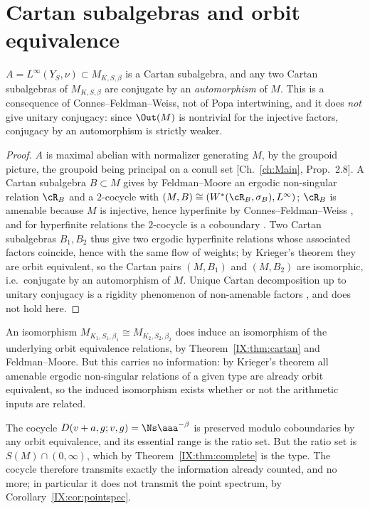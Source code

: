 \section{Cartan subalgebras and orbit equivalence}

\begin{theorem}\label{IX:thm:cartan}
$A=L^\infty(Y_S,\nu)\subset M_{K,S,\beta}$ is a Cartan subalgebra, and any two Cartan
subalgebras of $M_{K,S,\beta}$ are conjugate by an \emph{automorphism} of $M$. This is a
consequence of Connes--Feldman--Weiss, not of Popa intertwining, and it does \emph{not} give
unitary conjugacy: since $\Out(M)$ is nontrivial for the injective factors, conjugacy by an
automorphism is strictly weaker.
\end{theorem}

\begin{proof}
$A$ is maximal abelian with normalizer generating $M$, by the groupoid picture, the groupoid
being principal on a conull set [Ch.~\ref{ch:Main}, Prop.~2.8]. A Cartan subalgebra $B\subset M$ gives
by Feldman--Moore \cite{FM} an ergodic non-singular relation $\cR_B$ and a $2$-cocycle with
$(M,B)\cong(W^*(\cR_B,\sigma_B),L^\infty)$; $\cR_B$ is amenable because $M$ is injective, hence
hyperfinite by Connes--Feldman--Weiss \cite{CFW}, and for hyperfinite relations the
$2$-cocycle is a coboundary \cite{FM}. Two Cartan subalgebras $B_1,B_2$ thus give two ergodic
hyperfinite relations whose associated factors coincide, hence with the same flow of weights;
by Krieger's theorem \cite{Krieger} they are orbit equivalent, so the Cartan pairs $(M,B_1)$
and $(M,B_2)$ are isomorphic, i.e.\ conjugate by an automorphism of $M$. Unique Cartan
decomposition up to unitary conjugacy is a rigidity phenomenon of non-amenable factors
\cite{Houdayer}, and does not hold here.
\end{proof}

\begin{corollary}\label{IX:cor:oe}
An isomorphism $M_{K_1,S_1,\beta_1}\cong M_{K_2,S_2,\beta_2}$ does induce an isomorphism of
the underlying orbit equivalence relations, by Theorem~\ref{IX:thm:cartan} and Feldman--Moore.
But this carries no information: by Krieger's theorem all amenable ergodic non-singular
relations of a given type are already orbit equivalent, so the induced isomorphism exists
whether or not the arithmetic inputs are related.
\end{corollary}

\begin{remark}\label{IX:rem:rn}
The cocycle $D(v+a,g;v,g)=\Ns\aaa^{-\beta}$ is preserved modulo coboundaries by any orbit
equivalence, and its essential range is the ratio set. But the ratio set is
$S(M)\cap(0,\infty)$, which by Theorem~\ref{IX:thm:complete} is the type. The cocycle therefore
transmits exactly the information already counted, and no more; in particular it does not
transmit the point spectrum, by Corollary~\ref{IX:cor:pointspec}.
\end{remark}

